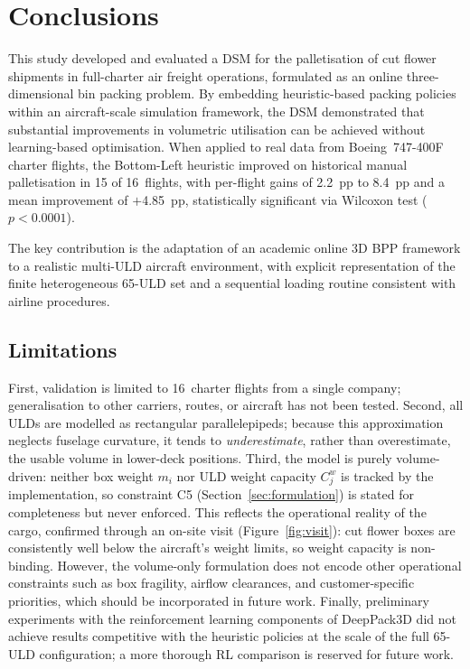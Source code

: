 \documentclass[12pt,a4paper]{article}
\begin{document}
\section{Conclusions}
\label{sec:conclusions}

This study developed and evaluated a DSM for the palletisation of cut
flower shipments in full-charter air freight operations, formulated as
an online three-dimensional bin packing problem.
By embedding heuristic-based packing policies within an aircraft-scale
simulation framework, the DSM demonstrated that substantial
improvements in volumetric utilisation can be achieved without
learning-based optimisation.
When applied to real data from Boeing~747-400F charter flights, the
Bottom-Left heuristic improved on historical manual palletisation in
15 of 16~flights, with per-flight gains of 2.2~pp to 8.4~pp and a
mean improvement of $+$4.85~pp, statistically significant via
Wilcoxon test ($p<0.0001$).

The key contribution is the adaptation of an academic online 3D BPP
framework to a realistic multi-ULD aircraft environment, with explicit
representation of the finite heterogeneous 65-ULD set and a
sequential loading routine consistent with airline procedures.

\subsection{Limitations}
\label{sec:limitations}

First, validation is limited to 16~charter flights from a single
company; generalisation to other carriers, routes, or aircraft has
not been tested.
Second, all ULDs are modelled as rectangular parallelepipeds; because
this approximation neglects fuselage curvature, it tends to
\emph{underestimate}, rather than overestimate, the usable volume in
lower-deck positions.
Third, the model is purely volume-driven: neither box weight $m_i$
nor ULD weight capacity $C_j^w$ is tracked by the implementation, so
constraint C5 (Section~\ref{sec:formulation}) is stated for
completeness but never enforced.
This reflects the operational reality of the cargo, confirmed through
an on-site visit (Figure~\ref{fig:visit}): cut flower boxes are
consistently well below the aircraft's weight limits, so weight
capacity is non-binding.
However, the volume-only formulation does not encode other operational
constraints such as box fragility, airflow clearances, and
customer-specific priorities, which should be incorporated in future
work.
Finally, preliminary experiments with the reinforcement learning
components of DeepPack3D did not achieve results competitive with the
heuristic policies at the scale of the full 65-ULD configuration; a
more thorough RL comparison is reserved for future work.
\end{document}
